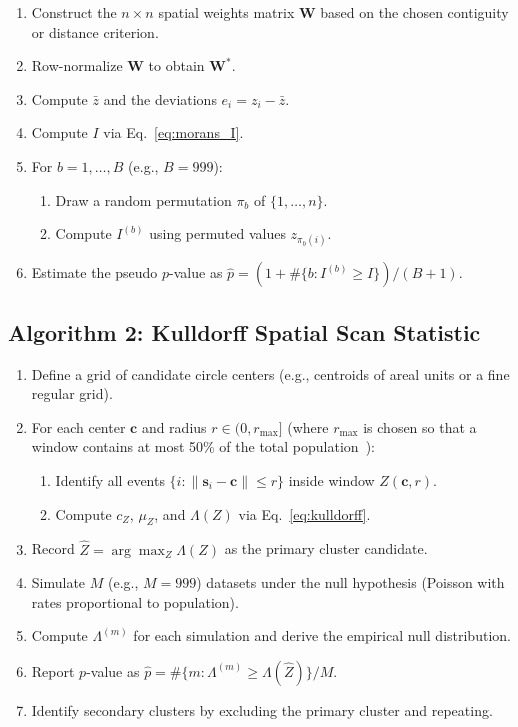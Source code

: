 \documentclass[conference]{IEEEtran}
\theoremstyle{definition}
\begin{document}
\begin{enumerate}
  \item Construct the $n \times n$ spatial weights matrix $\mathbf{W}$ based on the chosen contiguity or distance criterion.
  \item Row-normalize $\mathbf{W}$ to obtain $\mathbf{W}^*$.
  \item Compute $\bar{z}$ and the deviations $e_i = z_i - \bar{z}$.
  \item Compute $I$ via Eq.~\eqref{eq:morans_I}.
  \item For $b = 1, \ldots, B$ (e.g., $B = 999$):
    \begin{enumerate}
      \item Draw a random permutation $\pi_b$ of $\{1, \ldots, n\}$.
      \item Compute $I^{(b)}$ using permuted values $z_{\pi_b(i)}$.
    \end{enumerate}
  \item Estimate the pseudo $p$-value as $\hat{p} = (1 + \#\{b : I^{(b)} \geq I\}) / (B + 1)$.
\end{enumerate}

\subsection{Algorithm 2: Kulldorff Spatial Scan Statistic}

\begin{enumerate}
  \item Define a grid of candidate circle centers (e.g., centroids of areal units or a fine regular grid).
  \item For each center $\mathbf{c}$ and radius $r \in (0, r_{\max}]$ (where $r_{\max}$ is chosen so that a window contains at most 50\% of the total population~\cite{kulldorff1997}):
    \begin{enumerate}
      \item Identify all events $\{i : \|\mathbf{s}_i - \mathbf{c}\| \leq r\}$ inside window $Z(\mathbf{c},r)$.
      \item Compute $c_Z$, $\mu_Z$, and $\Lambda(Z)$ via Eq.~\eqref{eq:kulldorff}.
    \end{enumerate}
  \item Record $\hat{Z} = \arg\max_{Z} \Lambda(Z)$ as the primary cluster candidate.
  \item Simulate $M$ (e.g., $M = 999$) datasets under the null hypothesis (Poisson with rates proportional to population).
  \item Compute $\Lambda^{(m)}$ for each simulation and derive the empirical null distribution.
  \item Report $p$-value as $\hat{p} = \#\{m : \Lambda^{(m)} \geq \Lambda(\hat{Z})\} / M$.
  \item Identify secondary clusters by excluding the primary cluster and repeating.
\end{enumerate}
\end{document}
